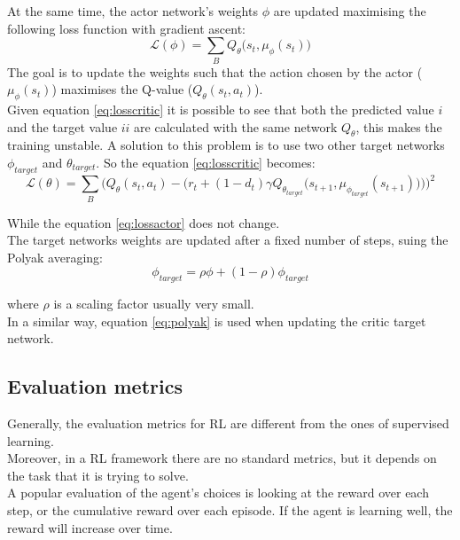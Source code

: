 \noindent At the same time, the actor network's weights $\phi$ are updated maximising the following loss function with gradient ascent:
\begin{equation} \label{eq:lossactor}
    \mathcal{L}(\phi) = \sum_B Q_{\theta}\big(s_t,\mu_{\phi}(s_t)\big)
\end{equation}
The goal is to update the weights such that the action chosen by the actor ($\mu_{\phi}(s_t)$) maximises the Q-value ($Q_{\theta}(s_t,a_t)$).\\

Given equation \ref{eq:losscritic} it is possible to see that both the predicted value $i$ and the target value $ii$ are calculated with the same network $Q_{\theta}$, this makes the training unstable. A solution to this problem is to use two other target networks $\phi_{target}$ and $\theta_{target}$. So the equation \ref{eq:losscritic} becomes:
\begin{equation*} \label{eq:losscritic2}
    \mathcal{L}(\theta) = \sum_B \Bigg( Q_{\theta}(s_t,a_t) - \Big( r_t + (1-d_t)\gamma Q_{\theta_{target}}\big(s_{t+1}, \mu_{\phi_{target}}(s_{t+1})\big)  \Big) \Bigg)^2
\end{equation*}

\noindent While the equation \ref{eq:lossactor} does not change.\\

The target networks weights are updated after a fixed number of steps, suing the Polyak averaging:
\begin{equation} \label{eq:polyak}
     \phi_{target} = \rho\phi + (1-\rho) \phi_{target}
\end{equation}

\noindent where $\rho$ is a scaling factor usually very small.\\
In a similar way, equation \ref{eq:polyak} is used when updating the critic target network.


\subsection{Evaluation metrics}
\label{ssec:evalmetricRL}
Generally, the evaluation metrics for \gls{RL} are different from the ones of supervised learning. \\
Moreover, in a \gls{RL} framework there are no standard metrics, but it depends on the task that it is trying to solve.\\

A popular evaluation of the agent's choices is looking at the reward over each step, or the cumulative reward over each episode. If the agent is learning well, the reward will increase over time.\\

